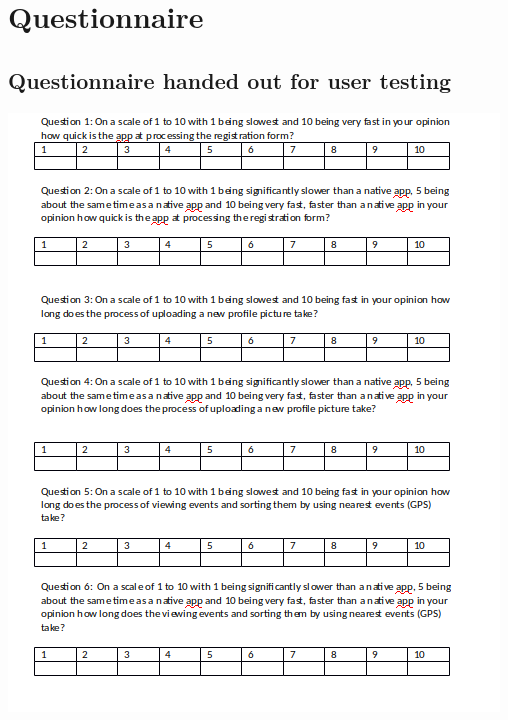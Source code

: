 \chapter{Questionnaire}
\section{Questionnaire handed out for user testing}
\includegraphics[scale=0.6]{images/ques}